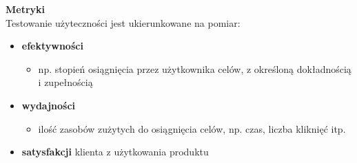 \documentclass[../main.tex]{subfiles}
\begin{document}
    \textbf{Metryki}\\
    Testowanie użyteczności jest ukierunkowane na pomiar:
    \begin{itemize}
        \item \textbf{efektywności}
        \begin{itemize}
            \item np. stopień osiągnięcia przez użytkownika celów, z
            określoną dokładnością i zupełnością
        \end{itemize}
        \item \textbf{wydajności}
        \begin{itemize}
            \item ilość zasobów zużytych do osiągnięcia celów, np. czas,
            liczba kliknięć itp.
        \end{itemize}
        \item \textbf{satysfakcji} klienta z użytkowania produktu
    \end{itemize}
\end{document}
